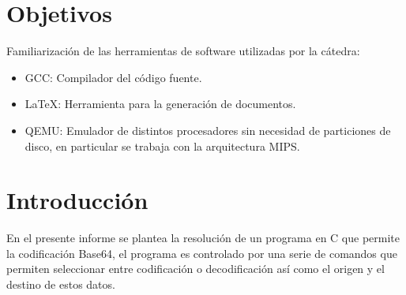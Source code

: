 \documentclass[titlepage,a4paper]{article}
\begin{document}
\tableofcontents %
\newpage


\section{Objetivos}\label{sec:objetivos}
Familiarización de las herramientas de software utilizadas por la cátedra:
\begin{itemize}
\item GCC: Compilador del código fuente.
\item \LaTeX: Herramienta para la generación de documentos.
\item QEMU: Emulador de distintos procesadores sin necesidad de particiones de disco, en particular se trabaja con la arquitectura MIPS.
\end{itemize}

\section{Introducción}\label{sec:intro}
En el presente informe se plantea la resolución de un programa en C que permite la codificación Base64, el programa es controlado por una serie de comandos que permiten seleccionar entre codificación o decodificación así como el origen y el destino de estos datos.
\end{document}
